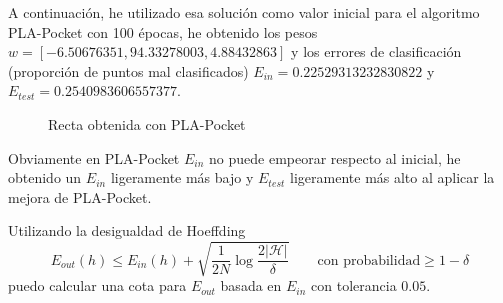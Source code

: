\documentclass[a4]{article}
\begin{document}
A continuación, he utilizado esa solución como valor inicial para
el algoritmo PLA-Pocket con 100 épocas, he obtenido los pesos $w= [-6.50676351, 94.33278003, 4.88432863]$
y los errores de clasificación (proporción de puntos mal clasificados)
$E_{in} = 0.22529313232830822$ y $E_{test} = 0.2540983606557377$.

\begin{figure}[H]
    \centering
    \caption{Recta obtenida con PLA-Pocket}
    \label{fig:lin-regress}
\end{figure}
\vspace{-3mm}

Obviamente en PLA-Pocket $E_{in}$ no puede empeorar respecto al inicial,
he obtenido un $E_{in}$ ligeramente más bajo y $E_{test}$ ligeramente más alto 
al aplicar la mejora de PLA-Pocket.

Utilizando la desigualdad de Hoeffding
\[E_{out}(h)\leq E_{in}(h)+\sqrt{\frac{1}{2N}\log{\frac{2|\mathcal{H}|}{\delta}}}\qquad\text{con probabilidad}\geq 1-\delta\]
puedo calcular una cota para $E_{out}$ basada en $E_{in}$ con tolerancia $0.05$.
\end{document}
